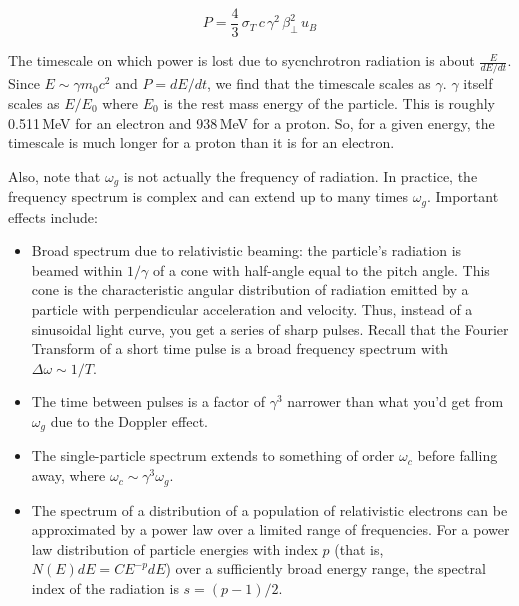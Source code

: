 \documentclass[12pt, letterpaper, preprint]{aastex}
\begin{document}
\begin{enumerate}
\begin{equation}
  P = \frac{4}{3} \, \sigma_T \, c \, \gamma^2 \, \beta_\bot^2 \, u_B
  \label{relativistic-larmor}
\end{equation}

The timescale on which power is lost due to sycnchrotron radiation
is about $\frac{E}{dE/dt}$. Since $E \sim \gamma m_0 c^2$ and
$ P = dE/dt$, we find that the timescale scales as $\gamma$. 
$\gamma$ itself scales as $E/E_0$ where $E_0$ is the rest mass energy
of the particle. This is roughly 0.511\,MeV for an electron and 938\,MeV
for a proton. So, for a given energy, the timescale is much longer
for a proton than it is for an electron.

Also, note that $\omega_g$ is not actually the frequency of radiation.
In practice, the frequency spectrum is complex and can extend up to many times $\omega_g$. Important effects include: 

\begin{itemize}

\item 
Broad spectrum due to relativistic beaming: the particle's radiation is beamed within $1/\gamma$ of a cone with half-angle equal to the pitch angle. This cone is the characteristic angular distribution of radiation emitted by a particle with perpendicular acceleration and velocity. Thus, instead of a sinusoidal light curve, you get a series of sharp pulses. Recall that the Fourier Transform of a short time pulse is a broad frequency spectrum with $\Delta \omega \sim 1/T$.

\item
The time between pulses is a factor of $\gamma^3$ narrower than what you'd get from $\omega_g$ due to the Doppler effect. 

\item
The single-particle spectrum extends to
something of order $\omega_c$ before falling away,
where $\omega_c \sim \gamma^3 \omega_g$. 

\item
The spectrum of a distribution of a population of relativistic electrons can be approximated by a power law over a limited range of frequencies. For a power law distribution of particle energies with index $p$ (that is, $N(E) dE = C E^{-p} dE$) over a sufficiently broad energy range, the spectral index of the radiation is $s = (p-1) / 2$. 

\end{itemize}

\newpage


\end{enumerate}
\end{document}
